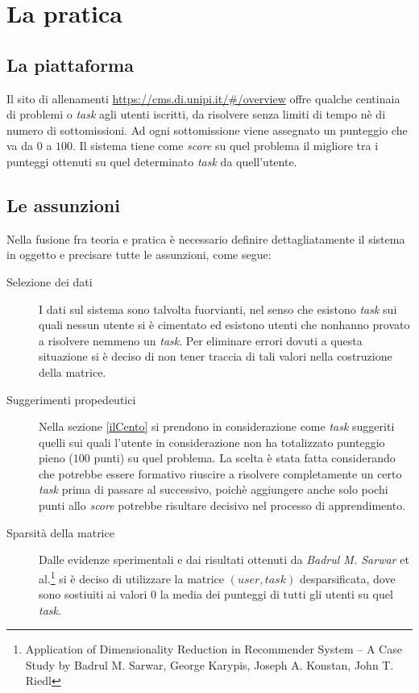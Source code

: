\documentclass[12pt,a4paper]{article}
\theoremstyle{thm}
\theoremstyle{def}
\begin{document}
\section{La pratica}


\subsection{La piattaforma}
Il sito di allenamenti \url{https://cms.di.unipi.it/#/overview} offre qualche centinaia di problemi o \textit{task} agli utenti iscritti, da risolvere senza limiti di tempo nè di numero di sottomissioni. Ad ogni sottomissione viene assegnato un punteggio che va da $0$ a $100$. Il sistema tiene come \textit{score} su quel problema il migliore tra i punteggi ottenuti su quel determinato \textit{task} da quell'utente.


\subsection{Le assunzioni}
Nella fusione fra teoria e pratica è necessario definire dettagliatamente il sistema in oggetto e precisare tutte le assunzioni, come segue:
\begin{description}
\item[{\sc Selezione dei dati}] I dati sul sistema sono talvolta fuorvianti, nel senso che esistono \textit{task} sui quali nessun utente si è cimentato ed esistono utenti che nonhanno provato a risolvere nemmeno un \textit{task}. Per eliminare errori dovuti a questa situazione si è deciso di non tener traccia di tali valori nella costruzione della matrice.
\item[{\sc Suggerimenti propedeutici}] Nella sezione \ref{ilCento} si prendono in considerazione come \textit{task} suggeriti quelli sui quali l'utente in considerazione non ha totalizzato punteggio pieno ($100$ punti) su quel problema. La scelta è stata fatta considerando che potrebbe essere formativo riuscire a risolvere completamente un certo \textit{task} prima di passare al successivo, poichè aggiungere anche solo pochi punti allo \textit{score} potrebbe risultare decisivo nel processo di apprendimento.
\item[{\sc Sparsità della matrice}] Dalle evidenze sperimentali e dai risultati ottenuti da \textit{Badrul M. Sarwar} et al.\footnote{Application of Dimensionality Reduction in Recommender System -- A Case Study by Badrul M. Sarwar, George Karypis, Joseph A. Konstan, John T. Riedl} si è deciso di utilizzare la matrice $(user, task)$ desparsificata, dove sono sostiuiti ai valori $0$ la media dei punteggi di tutti gli utenti su quel \textit{task}.
\end{description}
\end{document}

